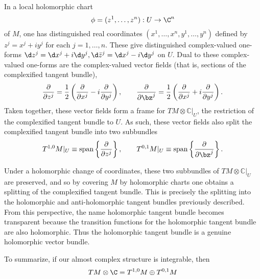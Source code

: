 \documentclass{worksheetclass}
\begin{document}
        


        In a local holomorphic chart 
        \begin{equation}
            \phi=(z^1,\dots,z^n):U\to\C^n
        \end{equation}
        of $M$, one has distinguished real coordinates $(x^{1},\dots ,x^{n},y^{1},\dots ,y^{n})$ defined by $z^j=x^j+iy^j$ for each $j=1,\dots,n$. These give distinguished complex-valued one-forms $\d z^j=\d x^j+i\d y^j,\d\bar{z}^j=\d x^j-i\d y^j$ on $U$. Dual to these complex-valued one-forms are the complex-valued vector fields (that is, sections of the complexified tangent bundle),
        \begin{equation}
            \pdv{}{z^j}=\frac{1}{2}\left( \pdv{}{x^j}-i\pdv{}{y^j} \right),\qquad \pdv{}{\bz^j}=\frac{1}{2}\left( \pdv{}{x^j}+i\pdv{}{y^j} \right).
        \end{equation}
        Taken together, these vector fields form a frame for $TM\otimes \mathbb{C}|_U$, the restriction of the complexified tangent bundle to $U$. As such, these vector fields also split the complexified tangent bundle into two subbundles
        \begin{equation}
            T^{1,0}M|_U\equiv\text{span}\left\{\pdv{}{z^j}\right\},\qquad  T^{0,1}M|_U\equiv\text{span}\left\{\pdv{}{\bz^j}\right\}.
        \end{equation}
        
        Under a holomorphic change of coordinates, these two subbundles of $TM\otimes \mathbb{C}|_U$ are preserved, and so by covering $M$ by holomorphic charts one obtains a splitting of the complexified tangent bundle. This is precisely the splitting into the holomorphic and anti-holomorphic tangent bundles previously described. From this perspective, the name holomorphic tangent bundle becomes transparent because the transition functions for the holomorphic tangent bundle are also holomorphic. Thus the holomorphic tangent bundle is a genuine holomorphic vector bundle.

        To summarize, if our almost complex structure is integrable, then
        \begin{equation}
            TM\otimes\C = T^{1,0}M\oplus T^{0,1}M
        \end{equation}
        
\end{document}
